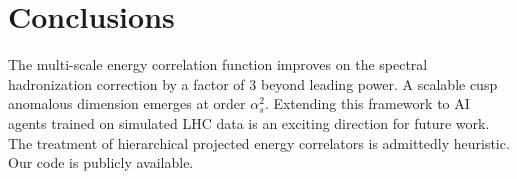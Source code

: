 \section{Conclusions}\label{sec:conclusions}

The multi-scale energy correlation function improves on the spectral
hadronization correction by a factor of 3 beyond leading power. A
scalable cusp anomalous dimension emerges at order $\alpha_s^2$.
Extending this framework to AI agents trained on simulated LHC data is
an exciting direction for future work. The treatment of hierarchical
projected energy correlators is admittedly heuristic. Our code is
publicly available.

